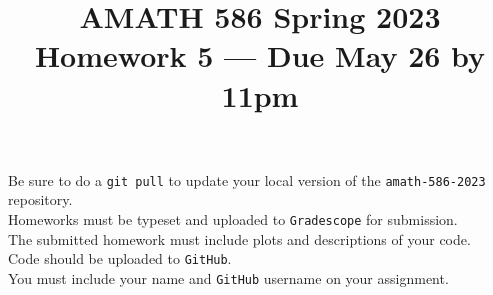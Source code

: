 \documentclass[10pt]{amsart}
\begin{document}
\pagestyle{empty}

\newcommand{\mline}{\vspace{.2in}\hrule\vspace{.2in}}


\title{\bf { AMATH 586 Spring 2023 \\ Homework 5 ---
Due May 26 by 11pm} }
\maketitle
\begin{center} Be sure to do a {\tt git pull} to update your local
  version of the {\tt amath-586-2023} repository.\\  Homeworks must be
  typeset and uploaded to {\tt Gradescope} for submission.\\
  The submitted homework must include plots and descriptions of your code.\\
  Code should be uploaded to {\tt GitHub}.\\
  You must include your name and {\tt GitHub} username on your assignment.
  \end{center}
\end{document}
